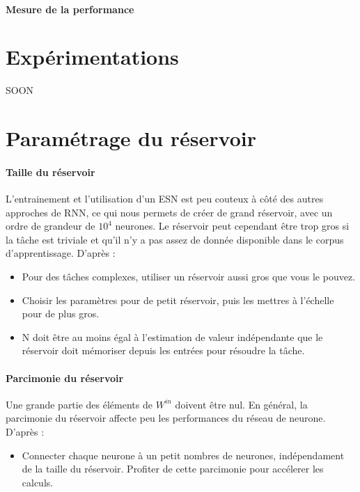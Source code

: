 \documentclass[12pt]{article}
\begin{document}
\paragraph{Mesure de la performance}


\section{Expérimentations}

SOON


\appendix

\section{Paramétrage du réservoir}

\paragraph{Taille du réservoir}
L'entrainement et l'utilisation d'un ESN est peu couteux à côté des autres approches de RNN, ce qui nous permets de créer de grand réservoir, avec un ordre de grandeur de $10^{4}$ neurones. Le réservoir peut cependant être trop gros si la tâche est triviale et qu'il n'y a pas assez de donnée disponible dans le corpus d'apprentissage.\newline
D'après \cite{Lukosevicius12}:
\begin{itemize}
\item Pour des tâches complexes, utiliser un réservoir aussi gros que vous le pouvez.
\item Choisir les paramètres pour de petit réservoir, puis les mettres à l'échelle pour de plus gros.
\item N doit être au moins égal à l'estimation de valeur indépendante que le réservoir doit mémoriser depuis les entrées pour résoudre la tâche.
\end{itemize}

\paragraph{Parcimonie du réservoir}
Une grande partie des éléments de $W^{in}$ doivent être nul. En général, la parcimonie du réservoir affecte peu les performances du réseau de neurone.\newline
D'après \cite{Lukosevicius12}:
\begin{itemize}
\item Connecter chaque neurone à un petit nombres de neurones, indépendament de la taille du réservoir. Profiter de cette parcimonie pour accélerer les calculs.
\end{itemize}
\end{document}
